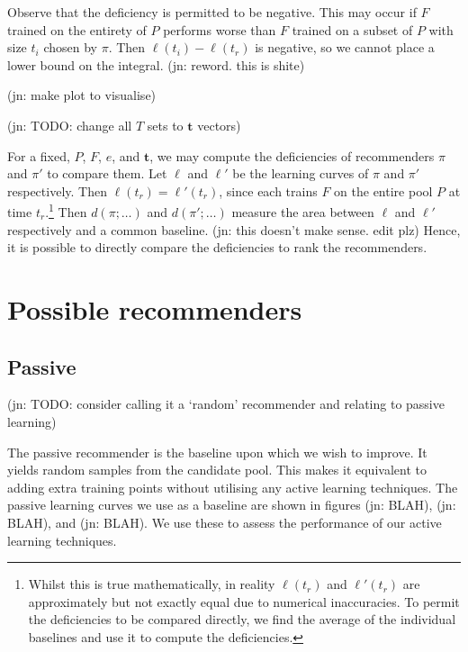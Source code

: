 \documentclass[11pt,twoside]{report}
\newcommand\bt{\mathbf{t}}
\newcommand\jn[1]{{\color{red}(jn: #1)}}
\begin{document}
Observe that the deficiency is permitted to be negative. This may occur if $F$ trained on the entirety of $P$ performs worse than $F$ trained on a subset of $P$ with size $t_i$ chosen by $\pi$. Then $\ell(t_i) - \ell(t_r)$ is negative, so we cannot place a lower bound on the integral. \jn{reword. this is shite}

\jn{make plot to visualise}

\jn{TODO: change all $T$ sets to $\bt$ vectors}

For a fixed, $P$, $F$, $e$, and $\bt$, we may compute the deficiencies of recommenders $\pi$ and $\pi'$ to compare them. Let $\ell$ and $\ell'$ be the learning curves of $\pi$ and $\pi'$ respectively. Then $\ell(t_r) = \ell'(t_r)$, since each trains $F$ on the entire pool $P$ at time $t_r$.\footnote{Whilst this is true mathematically, in reality $\ell(t_r)$ and $\ell'(t_r)$ are approximately but not exactly equal due to numerical inaccuracies. To permit the deficiencies to be compared directly, we find the average of the individual baselines and use it to compute the deficiencies.} Then $d(\pi;\dots)$ and $d(\pi';\dots)$ measure the area between $\ell$ and $\ell'$ respectively and a common baseline. \jn{this doesn't make sense. edit plz} Hence, it is possible to directly compare the deficiencies to rank the recommenders.



\section{Possible recommenders}

\subsection{Passive}

\jn{TODO: consider calling it a `random' recommender and relating to passive learning}

The passive recommender is the baseline upon which we wish to improve. It yields random samples from the candidate pool. This makes it equivalent to adding extra training points without utilising any active learning techniques. The passive learning curves we use as a baseline are shown in figures \jn{BLAH}, \jn{BLAH}, and \jn{BLAH}. We use these to assess the performance of our active learning techniques.
\end{document}

